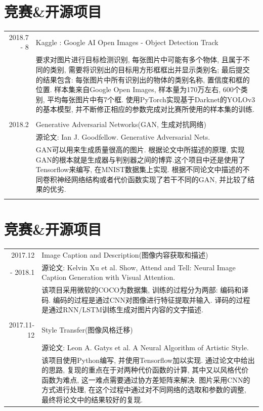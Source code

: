\documentclass[a4paper,11pt]{article}
\begin{document}
\section{竞赛\&开源项目}
\begin{tabular}{r|p{11cm}}
\textsc{2018.7 - 8} & Kaggle : Google AI Open Images - Object Detection Track\\&\footnotesize{要求对图片进行目标检测识别, 每张图片中可能有多个物体, 且属于不同的类别, 需要将识别出的目标用方形框框出并显示类别名; 最后提交的结果包含: 每张图片中所有识别出的物体的类别名称, 置信度和框的位置. 样本集来自Google Open Images, 样本量为170万左右, 600个类别, 平均每张图片中有7个框. 使用PyTorch实现基于Darknet的YOLOv3的基本模型, 并不断修正相应的参数完成对比赛所使用的样本集的训练.}\\\multicolumn{2}{c}{} \\
\textsc{2018.2} & Generative Adversarial Networks(GAN, 生成对抗网络)\\&\footnotesize{源论文: Ian J. Goodfellow. Generative Adversarial Nets.}\\&\footnotesize{GAN可以用来生成质量很高的图片. 根据论文中所描述的原理, 实现GAN的根本就是生成器与判别器之间的博弈.这个项目中还是使用了Tensorflow来编写, 在MNIST数据集上实现. 根据不同论文中描述的不同卷积神经网络结构或者代价函数实现了若干不同的GAN, 并比较了结果的优劣.}\\\multicolumn{2}{c}{} \\
\end{tabular}

\section{竞赛\&开源项目}
\begin{tabular}{r|p{11cm}}
\textsc{2017.12} & Image Caption and Description(图像内容获取和描述)\\{- 2018.1}&\footnotesize{源论文: Kelvin Xu et al. Show, Attend and Tell: Neural Image Caption
Generation with Visual Attention.}\\&\footnotesize{该项目采用微软的COCO为数据集, 训练的过程分为两部: 编码和译码. 编码的过程是通过CNN对图像进行特征提取并输入. 译码的过程是通过RNN/LSTM训练生成对图片内容的文字描述.  }\\\multicolumn{2}{c}{} \\
\textsc{2017.11-12} & Style Transfer(图像风格迁移)\\&\footnotesize{源论文: Leon A. Gatys et al. A Neural Algorithm of Artistic Style.}\\&\footnotesize{该项目使用Python编写, 并使用Tensorflow加以实现. 通过论文中给出的思路, 复现的重点在于对两种代价函数的计算, 其中又以风格代价函数为难点, 这一难点需要通过协方差矩阵来解决. 图片采用CNN的方式进行处理, 在这个过程中通过对不同网络的选取和参数的调整, 最终将论文中的结果较好的复现. }
\end{tabular}
\end{document}
